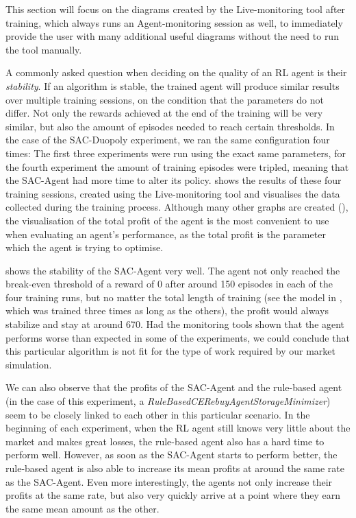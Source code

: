 This section will focus on the diagrams created by the Live-monitoring tool after training, which always runs an Agent-monitoring session as well, to immediately provide the user with many additional useful diagrams without the need to run the tool manually.

A commonly asked question when deciding on the quality of an RL agent is their \emph{stability}. If an algorithm is stable, the trained agent will produce similar results over multiple training sessions, on the condition that the parameters do not differ. Not only the rewards achieved at the end of the training will be very similar, but also the amount of episodes needed to reach certain thresholds. In the case of the SAC-Duopoly experiment, we ran the same configuration four times: The first three experiments were run using the exact same parameters, for the fourth experiment the amount of training episodes were tripled, meaning that the SAC-Agent had more time to alter its policy.  shows the results of these four training sessions, created using the Live-monitoring tool and visualises the data collected during the training process. Although many other graphs are created (), the visualisation of the total profit of the agent is the most convenient to use when evaluating an agent's performance, as the total profit is the parameter which the agent is trying to optimise.

 shows the stability of the SAC-Agent very well. The agent not only reached the break-even threshold of a reward of 0 after around 150 episodes in each of the four training runs, but no matter the total length of training (see the model in , which was trained three times as long as the others), the profit would always stabilize and stay at around 670. Had the monitoring tools shown that the agent performs worse than expected in some of the experiments, we could conclude that this particular algorithm is not fit for the type of work required by our market simulation.

We can also observe that the profits of the SAC-Agent and the rule-based agent (in the case of this experiment, a \emph{RuleBasedCERebuyAgentStorageMinimizer}) seem to be closely linked to each other in this particular scenario. In the beginning of each experiment, when the RL agent still knows very little about the market and makes great losses, the rule-based agent also has a hard time to perform well. However, as soon as the SAC-Agent starts to perform better, the rule-based agent is also able to increase its mean profits at around the same rate as the SAC-Agent. Even more interestingly, the agents not only increase their profits at the same rate, but also very quickly arrive at a point where they earn the same mean amount as the other.

